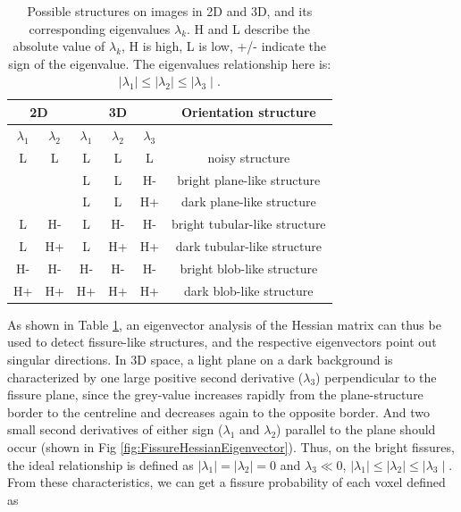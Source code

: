 {\begin{table}[h]
\centering
\caption{Possible structures on images in 2D and 3D, and its corresponding eigenvalues $\lambda_k$. H and L describe the absolute value of $\lambda_k$, H is high, L is low, +/- indicate the sign of the eigenvalue. The eigenvalues relationship here is: $\mid\lambda_{1}\mid\leq\mid\lambda_{2}\mid\leq\mid\lambda_{3}\mid$.}
\label{tab:Hessian-based eigenvalue analysis}
\begin{tabular}{c c | c c c | c}
\hline
\multicolumn{2}{c|}{\bf{2D}} & \multicolumn{3}{c|}{\bf{3D}} & \bf{Orientation structure}\\ 
\hline
$\lambda_1$ & $\lambda_2$ &  $\lambda_1$ & $\lambda_2$ & $\lambda_3$ &  \\
\hline
   L      &     L     &      L     &     L     &      L     & noisy structure \\
          &           &      L     &     L     &      H-    & bright plane-like structure \\
          &           &      L     &     L     &      H+    & dark plane-like structure \\
   L      &     H-    &      L     &     H-    &      H-    & bright tubular-like structure \\
   L      &     H+    &      L     &     H+    &      H+    & dark tubular-like structure \\
   H-     &     H-    &      H-    &     H-    &      H-    & bright blob-like structure \\	
   H+     &     H+    &      H+    &     H+    &      H+    & dark blob-like structure \\												
\hline
\end{tabular}
\end{table}

As shown in Table \ref{tab:Hessian-based eigenvalue analysis}, an eigenvector analysis of the Hessian matrix can thus be used to detect fissure-like structures, and the respective eigenvectors point out singular directions. In 3D space, a light plane on a dark background is characterized by one large positive second derivative ($\lambda_3$) perpendicular to the fissure plane, since the grey-value increases rapidly from the plane-structure border to the centreline and decreases again to the opposite border. And two small second derivatives of either sign ($\lambda_1$ and $\lambda_2$) parallel to the plane should occur (shown in Fig \ref{fig:FissureHessianEigenvector}). Thus, on the bright fissures, the ideal relationship is defined as $\mid\lambda_{1}\mid = \mid\lambda_{2}\mid = 0$ and $\lambda_{3} \ll 0$, $\mid\lambda_{1}\mid\leq\mid\lambda_{2}\mid\leq\mid\lambda_{3}\mid$. From these characteristics, we can get a fissure probability of each voxel defined as

}
